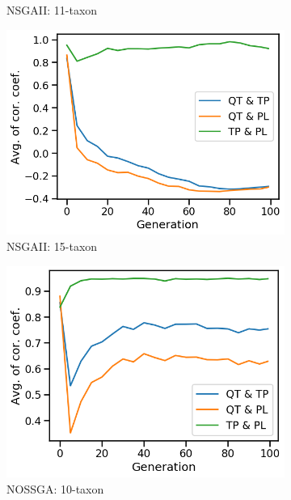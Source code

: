 \begin{figure}[!htbp]
\begin{adjustwidth}{-1cm}{-1cm}
\begin{subfigure}[b]{0.4\textwidth}
			\caption{NSGAII: 11-taxon}
		\end{subfigure}%
		\begin{subfigure}[b]{0.4\textwidth}
			\includegraphics[width=\textwidth]{Figure/15-taxon_NSGAII_corr_plot}
			\caption{NSGAII: 15-taxon}
		\end{subfigure}	
		\begin{subfigure}[b]{0.4\textwidth}
			\includegraphics[width=\textwidth]{Figure/10-taxon_NOSSGA_corr_plot}
			\caption{NOSSGA: 10-taxon}
		\end{subfigure}%
		\begin{subfigure}[b]{0.4\textwidth}

\end{subfigure}
\end{adjustwidth}
\end{figure}
